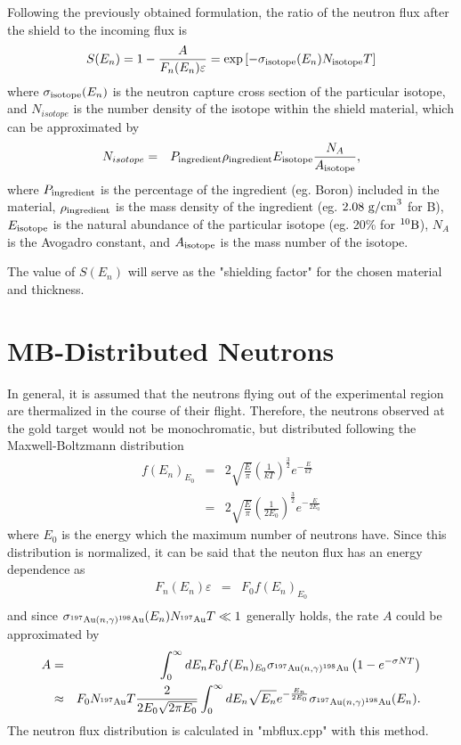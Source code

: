\documentclass{article}
\begin{document}
Following the previously obtained formulation, the ratio of the neutron flux after the shield to the incoming flux is
$$
    S(E_n) = 1 - \frac{A}{F_n(E_n)\varepsilon} = \exp{\left[ -\sigma_{\rm isotope}(E_n) N_{\rm isotope} T \right]}
$$
where $\sigma_{\rm isotope}(E_n)$ is the neutron capture cross section of the particular isotope, and $N_{isotope}$ is the number density of the isotope within the shield material,
which can be approximated by 
\begin{eqnarray*}
N_{isotope} & = & P_{\rm ingredient} \rho_{\rm ingredient} E_{\rm isotope} \frac{N_A}{A_{\rm isotope}} ,
\end{eqnarray*}
where $P_{\rm ingredient}$ is the percentage of the ingredient (eg. Boron) included in the material,
$\rho_{\rm ingredient}$ is the mass density of the ingredient (eg. $2.08~{\rm g/cm}^3$ for B),
$E_{\rm isotope}$ is the natural abundance of the particular isotope (eg. 20\% for ${}^{10}{\rm B}$),
$N_A$ is the Avogadro constant, and $A_{\rm isotope}$ is the mass number of the isotope.

The value of $S(E_n)$ will serve as the "shielding factor" for the chosen material and thickness.



\section{MB-Distributed Neutrons}

In general, it is assumed that the neutrons flying out of the experimental region are thermalized in the course of their flight. Therefore, the neutrons observed at the gold target would not be monochromatic, but distributed following the Maxwell-Boltzmann distribution
\begin{eqnarray*}
f(E_n)_{E_0} & = & 2 \sqrt{\frac{E}{\pi}} \left( \frac{1}{kT} \right)^\frac{3}{2} e^{-\frac{E}{kT}} \\
& = & 2 \sqrt{\frac{E}{\pi}} \left( \frac{1}{2E_0} \right)^\frac{3}{2} e^{-\frac{E}{2E_0}}
\end{eqnarray*}
where $E_0$ is the energy which the maximum number of neutrons have. Since this distribution is normalized, it can be said that the neuton flux has an energy dependence as
\begin{eqnarray*}
F_{n}(E_n) \varepsilon & = & F_0 f(E_n)_{E_0} \\
\end{eqnarray*}
and since $\sigma_{^{197}{\rm Au}(n,\gamma)^{198}{\rm Au}}(E_n) N_{^{197}{\rm Au}} T \ll 1$ generally holds, the rate $A$ could be approximated by
\begin{eqnarray*}
A & = & \int_{0}^{\infty} dE_n F_0 f(E_n)_{E_0} \sigma_{^{197}{\rm Au}(n,\gamma)^{198}{\rm Au}} \left( 1 - e^{-\sigma N T} \right) \\
& \approx & F_0 N_{^{197}{\rm Au}}T \frac{2}{2E_0\sqrt{2\pi E_0}} \int_0^\infty dE_n \sqrt{E_n} e^{-\frac{E_n}{2E_0}} \sigma_{^{197}{\rm Au}(n,\gamma){^{198}{\rm Au}}} (E_n) .
\end{eqnarray*}
The neutron flux distribution is calculated in "mbflux.cpp" with this method.
\end{document}

